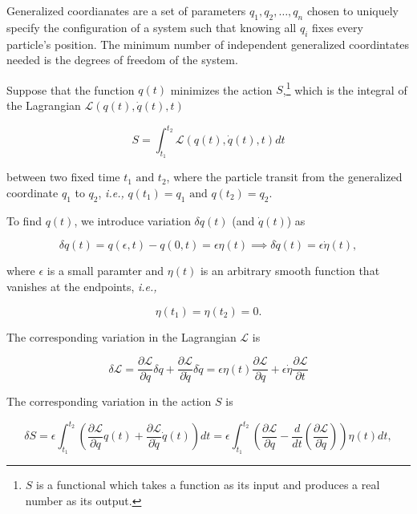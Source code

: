 \documentclass[a4paper,12pt]{report}
\begin{document}
Generalized coordianates are a set of parameters \(q_1 ,q_2 ,\ldots ,q_{n} \) chosen to uniquely specify the configuration of a system such that knowing all \(q_{i} \) fixes every particle's position. The minimum number of independent generalized coordintates needed is the degrees of freedom of the system.  

Suppose that the function \(q(t)\) minimizes the action \(S\),\footnote{\(S\) is a functional which takes a function as its input and produces a real number as its output.} which is the integral of the Lagrangian \(\mathcal{L}(q(t), \dot{q}(t), t )\) 

\begin{equation}
	S = \int_{t_1  }^{t_2  } \mathcal{L}\left( q(t),\dot{q}(t) ,t \right) dt
\end{equation}

between two fixed time \(t_1 \text { and } t_2 \), where the particle transit from the generalized coordinate \(q_1 \) to \(q_2 \), \textit{i.e.,} \(q(t_1)=q_1 \text { and } q(t_2 ) = q_2 \).     

To find \(q(t)\), we introduce variation \(\delta q(t)\) (and \(\dot{q} (t)\)) as

\begin{equation}
	\delta q(t) = q(\epsilon ,t) - q(0,t) = \epsilon \eta (t) \implies \delta \dot{q}(t) = \epsilon \dot{\eta }(t),  
\end{equation}

where \(\epsilon \) is a small paramter and \(\eta (t)\) is an arbitrary smooth function that vanishes at the endpoints, \textit{i.e.,} 

\begin{equation}
	\eta (t_1 ) = \eta (t_2 ) = 0. \label{etabound} 
\end{equation}

The corresponding variation in the Lagrangian \(\mathcal{L}\) is

\begin{equation}
	\delta \mathcal{L} = \frac{\partial \mathcal{L}}{\partial q} \delta q + \frac{\partial \mathcal{L}}{\partial \dot{q} } \delta \dot{q} = \epsilon \eta (t) \frac{\partial \mathcal{L}}{\partial q} + \epsilon \dot{\eta } \frac{\partial \mathcal{L}}{\partial t}     
\end{equation}

The corresponding variation in the action \(S\) is

\begin{equation}
	\delta S = \epsilon \int_{t_1 }^{t_2 } \left( \frac{\partial \mathcal{L}}{\partial q}q(t) + \frac{\partial \mathcal{L}}{\partial \dot{q} }\dot{q} (t)   \right) dt  =\epsilon \int_{t_1 }^{t_2 } \left( \frac{\partial \mathcal{L}}{\partial q} - \frac{d}{dt} \left( \frac{\partial \mathcal{L}}{\partial \dot{q} }  \right)   \right) \eta (t) dt,
\end{equation}
\end{document}
